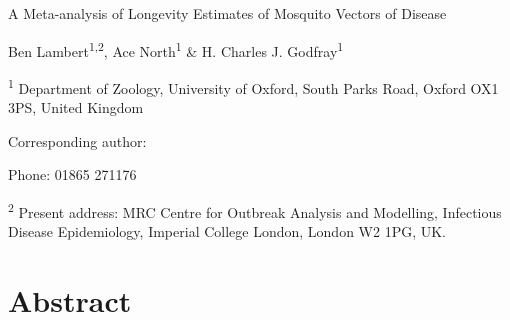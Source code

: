 \documentclass[]{article}
\date{}
\begin{document}
	

A Meta-analysis of Longevity Estimates of Mosquito Vectors of Disease

Ben Lambert\textsuperscript{1,2}, Ace North\textsuperscript{1} \& H.
Charles J. Godfray\textsuperscript{1}

\textsuperscript{1} Department of Zoology, University of Oxford, South
Parks Road, Oxford OX1 3PS, United Kingdom

Corresponding author:

Phone: 01865 271176

\textsuperscript{2} Present address: MRC Centre for Outbreak Analysis
and Modelling, Infectious Disease Epidemiology, Imperial College London,
London W2 1PG, UK.


\section{Abstract}\label{abstract}
\end{document}
